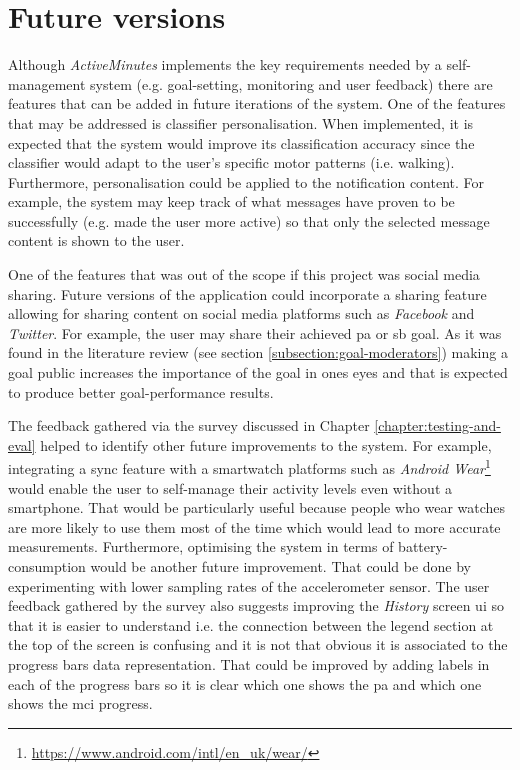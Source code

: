 \section{Future versions}
Although \textit{ActiveMinutes} implements the key requirements needed by a self-management system (e.g. goal-setting, monitoring and user feedback) there are features that can be added in future iterations of the system. One of the features that may be addressed is classifier personalisation. When implemented, it is expected that the system would improve its classification accuracy since the classifier would adapt to the user's specific motor patterns (i.e. walking). Furthermore, personalisation could be applied to the notification content. For example, the system may keep track of what messages have proven to be successfully (e.g. made the user more active) so that only the selected message content is shown to the user.

One of the features that was out of the scope if this project was social media sharing. Future versions of the application could incorporate a sharing feature allowing for sharing content on social media platforms such as \textit{Facebook} and \textit{Twitter}. For example, the user may share their achieved \gls{pa} or \gls{sb} goal. As it was found in the literature review (see section \ref{subsection:goal-moderators}) making a goal public increases the importance of the goal in ones eyes and that is expected to produce better goal-performance results. 

The feedback gathered via the survey discussed in Chapter \ref{chapter:testing-and-eval} helped to identify other future improvements to the system. For example, integrating a sync feature with a smartwatch platforms such as \textit{Android Wear}\footnote{\url{https://www.android.com/intl/en_uk/wear/}} would enable the user to self-manage their activity levels even without a smartphone. That would be particularly useful because people who wear watches are more likely to use them most of the time which would lead to more accurate measurements. Furthermore, optimising the system in terms of battery-consumption would be another future improvement. That could be done by experimenting with lower sampling rates of the accelerometer sensor. The user feedback gathered by the survey also suggests improving the \textit{History} screen \gls{ui} so that it is easier to understand i.e. the connection between the legend section at the top of the screen is confusing and it is not that obvious it is associated to the progress bars data representation. That could be improved by adding labels in each of the progress bars so it is clear which one shows the \gls{pa} and which one shows the \gls{mci} progress.

